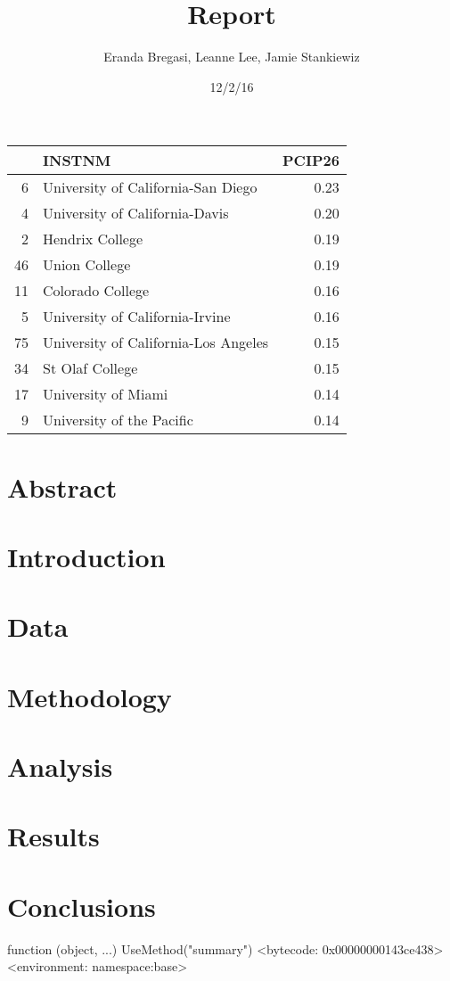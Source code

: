 \documentclass{article}
\begin{document}
\title{Report}
\author{Eranda Bregasi, Leanne Lee, Jamie Stankiewiz}
\date{12/2/16}
\maketitle





\begin{table}[ht]
\centering
\begin{tabular}{rlr}
  \hline
 & INSTNM & PCIP26 \\ 
  \hline
6 & University of California-San Diego & 0.23 \\ 
  4 & University of California-Davis & 0.20 \\ 
  2 & Hendrix College & 0.19 \\ 
  46 & Union College & 0.19 \\ 
  11 & Colorado College & 0.16 \\ 
  5 & University of California-Irvine & 0.16 \\ 
  75 & University of California-Los Angeles & 0.15 \\ 
  34 & St Olaf College & 0.15 \\ 
  17 & University of Miami & 0.14 \\ 
  9 & University of the Pacific & 0.14 \\ 
   \hline
\end{tabular}
\end{table}

\section{Abstract}

\section{Introduction}

\section{Data}

\section{Methodology}

\section{Analysis}

\section{Results}

\section{Conclusions}
\begin{Schunk}
\begin{Soutput}
function (object, ...) 
UseMethod("summary")
<bytecode: 0x00000000143ce438>
<environment: namespace:base>
\end{Soutput}
\end{Schunk}
\end{document}
